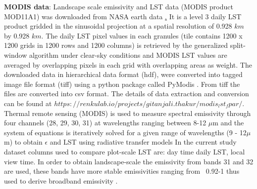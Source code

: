 \documentclass[fleqn,10pt]{wlscirep}
\begin{document}
{{\textbf{MODIS data}:
Landscape scale emissivity and LST data (MODIS product MOD11A1) was downloaded from NASA earth data \href{https://lpdaac.usgs.gov/}. It is a level 3 daily LST product gridded in the sinusoidal projection at a spatial resolution of 0.928 $km$ by 0.928 $km$. The daily LST pixel values in each granules (tile contains 1200 x 1200 grids in 1200 rows and 1200 columns) is retrieved by the generalized split-window algorithm under clear-sky conditions and MODIS LST values are averaged by overlapping pixels in each grid with overlapping areas as weight\cite{wan2007collection}. The downloaded data in hierarchical data format (hdf), were converted into tagged image file format (tiff) using a python package called PyModis \cite{delucchi2014pymodis}. From tiff the files are converted into csv format. The details of data extraction and conversion can be found at $https://renkulab.io/projects/gitanjali.thakur/modis_lst_fpar/$. %
Thermal remote sensing (MODIS) is used to measure spectral emissivity through four channels (28, 29, 30, 31) at wavelengths ranging between 8-12 $\mu$m \cite{jin_improved_2006-1} and the system of equations is iteratively solved for a given range of wavelengths (9 - 12$\mu$m) to obtain $\epsilon$ and LST using radiative transfer models\cite{hulley2012quantifying,jin2006improved,wang_evaluation_2009} In the current study dataset columns used to compare plot-scale LST are: day time daily LST, local view time. In order to obtain landscape-scale the emissivity from bands 31 and 32 are used, these bands have more stable emissivities ranging from ~0.92-1 thus used to derive broadband emissivity \cite{wan_land_nodate-1}. 
 
}}
\end{document}
